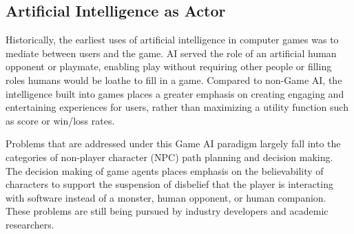 \documentclass[conference]{IEEEtran}
\newcommand{\mytodo}[1]{\textbf{[[#1]]}}
\begin{document}
\subsection{Artificial Intelligence as Actor}

%
%
Historically, the earliest uses of artificial intelligence in computer games was to mediate between users and the game.
AI served the role of an artificial human opponent or playmate, enabling play without requiring other people or filling roles humans would be loathe to fill in a game.
%
Compared to non-Game AI, the intelligence built into games places a greater emphasis on creating engaging and entertaining experiences for users, 
rather than maximizing a utility function such as score or win/loss rates. 

Problems that are addressed under this Game AI paradigm largely fall into the categories of non-player character (NPC) path planning and decision making.
The decision making of game agents places emphasis on the believability of characters to support the suspension of disbelief that the player is interacting with software instead of a monster, human opponent, or human companion.
These problems are still being pursued by industry developers and academic researchers.
\end{document}
